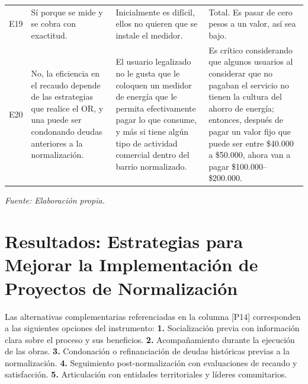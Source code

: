 \begin{longtable}{>{\centering}p{0.7cm}
                  >{\RaggedRight}p{4.5cm}
                  >{\RaggedRight}p{4.5cm}
                  >{\RaggedRight\arraybackslash}p{4.5cm}}
E19 & Sí porque se mide y se cobra con exactitud. & Inicialmente es difícil, ellos no quieren que se instale el medidor. & Total. Es pasar de cero pesos a un valor, así sea bajo. \\
\rowcolor{grisclaro}
E20 & No, la eficiencia en el recaudo depende de las estrategias que realice el OR, y una puede ser condonando deudas anteriores a la normalización. & El usuario legalizado no le gusta que le coloquen un medidor de energía que le permita efectivamente pagar lo que consume, y más si tiene algún tipo de actividad comercial dentro del barrio normalizado. & Es crítico considerando que algunos usuarios al considerar que no pagaban el servicio no tienen la cultura del ahorro de energía; entonces, después de pagar un valor fijo que puede ser entre \$40.000 a \$50.000, ahora van a pagar \$100.000--\$200.000. \\
\end{longtable}
\noindent\textit{Fuente: Elaboración propia.}


\section*{Resultados: Estrategias para Mejorar la Implementación de Proyectos de Normalización}

Las alternativas complementarias referenciadas en la columna [P14] corresponden a las siguientes opciones del instrumento: \textbf{1.} Socialización previa con información clara sobre el proceso y sus beneficios. \textbf{2.} Acompañamiento durante la ejecución de las obras. \textbf{3.} Condonación o refinanciación de deudas históricas previas a la normalización. \textbf{4.} Seguimiento post-normalización con evaluaciones de recaudo y satisfacción. \textbf{5.} Articulación con entidades territoriales y líderes comunitarios.

